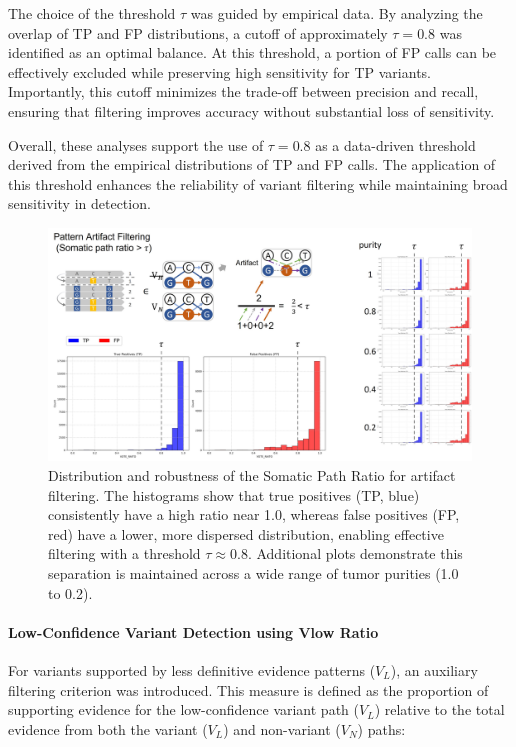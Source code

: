 \documentclass[pdflatex,sn-nature]{sn-jnl}
\def\pandocbounded#1{%
  \begingroup
  \setkeys{Gin}{width=1.0\linewidth,height=1.0\textheight,keepaspectratio}%
  #1%
  \endgroup
}
\begin{document}
The choice of the threshold \(\tau\) was guided by empirical data. By analyzing the overlap of TP and FP distributions, a cutoff of approximately \(\tau = 0.8\) was identified as an optimal balance. At this threshold, a portion of FP calls can be effectively excluded while preserving high sensitivity for TP variants. Importantly, this cutoff minimizes the trade-off between precision and recall, ensuring that filtering improves accuracy without substantial loss of sensitivity.

Overall, these analyses support the use of \(\tau = 0.8\) as a data-driven threshold derived from the empirical distributions of TP and FP calls. The application of this threshold enhances the reliability of variant filtering while maintaining broad sensitivity in detection.

\begin{figure}
\centering
\pandocbounded{\includegraphics[keepaspectratio]{page_39_cropped.jpg}}
\caption[Somatic Path Ratio Distribution]{Distribution and robustness of the Somatic Path Ratio for artifact filtering. The histograms show that true positives (TP, blue) consistently have a high ratio near 1.0, whereas false positives (FP, red) have a lower, more dispersed distribution, enabling effective filtering with a threshold \(\tau \approx 0.8\). Additional plots demonstrate this separation is maintained across a wide range of tumor purities (1.0 to 0.2).}\label{fig:app-page-39-cropped-jpg}
\end{figure}

\paragraph{Low-Confidence Variant Detection using Vlow Ratio}\label{low-confidence-variant-detection-using-vlow-ratio}

For variants supported by less definitive evidence patterns (\(V_L\)), an auxiliary filtering criterion was introduced. This measure is defined as the proportion of supporting evidence for the low-confidence variant path (\(V_L\)) relative to the total evidence from both the variant (\(V_L\)) and non-variant (\(V_N\)) paths:
\end{document}
